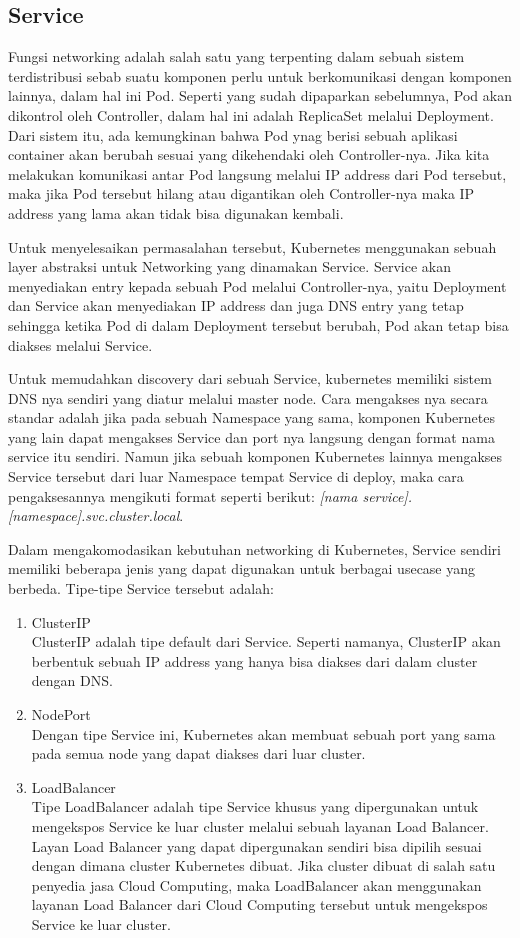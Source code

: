 \subsection{Service}
Fungsi networking adalah salah satu yang terpenting dalam sebuah sistem terdistribusi sebab suatu komponen perlu untuk berkomunikasi dengan komponen lainnya, dalam hal ini Pod.
Seperti yang sudah dipaparkan sebelumnya, Pod akan dikontrol oleh Controller, dalam hal ini adalah ReplicaSet melalui Deployment.
Dari sistem itu, ada kemungkinan bahwa Pod ynag berisi sebuah aplikasi container akan berubah sesuai yang dikehendaki oleh Controller-nya.
Jika kita melakukan komunikasi antar Pod langsung melalui IP address dari Pod tersebut, maka jika Pod tersebut hilang atau digantikan oleh Controller-nya maka IP address yang lama akan tidak bisa digunakan kembali.

Untuk menyelesaikan permasalahan tersebut, Kubernetes menggunakan sebuah layer abstraksi untuk Networking yang dinamakan Service.
Service akan menyediakan entry kepada sebuah Pod melalui Controller-nya, yaitu Deployment dan Service akan menyediakan IP address dan juga DNS entry yang tetap sehingga ketika Pod di dalam Deployment tersebut berubah, Pod akan tetap bisa diakses melalui Service.

Untuk memudahkan discovery dari sebuah Service, kubernetes memiliki sistem DNS nya sendiri yang diatur melalui master node.
Cara mengakses nya secara standar adalah jika pada sebuah Namespace yang sama, komponen Kubernetes yang lain dapat mengakses Service dan port nya langsung dengan format nama service itu sendiri.
Namun jika sebuah komponen Kubernetes lainnya mengakses Service tersebut dari luar Namespace tempat Service di deploy, maka cara pengaksesannya mengikuti format seperti berikut: \textit{[nama service].[namespace].svc.cluster.local}.

Dalam mengakomodasikan kebutuhan networking di Kubernetes, Service sendiri memiliki beberapa jenis yang dapat digunakan untuk berbagai usecase yang berbeda.
Tipe-tipe Service tersebut adalah:
\begin{enumerate}
      \item ClusterIP \\
            ClusterIP adalah tipe default dari Service. Seperti namanya, ClusterIP akan berbentuk sebuah IP address yang hanya bisa diakses dari dalam cluster dengan DNS.
      \item NodePort \\
            Dengan tipe Service ini, Kubernetes akan membuat sebuah port yang sama pada semua node yang dapat diakses dari luar cluster.
      \item LoadBalancer \\
            Tipe LoadBalancer adalah tipe Service khusus yang dipergunakan untuk mengekspos Service ke luar cluster melalui sebuah layanan Load Balancer. Layan Load Balancer yang dapat dipergunakan sendiri bisa dipilih sesuai dengan dimana cluster Kubernetes dibuat. Jika cluster dibuat di salah satu penyedia jasa Cloud Computing, maka LoadBalancer akan menggunakan layanan Load Balancer dari Cloud Computing tersebut untuk mengekspos Service ke luar cluster.
\end{enumerate}

